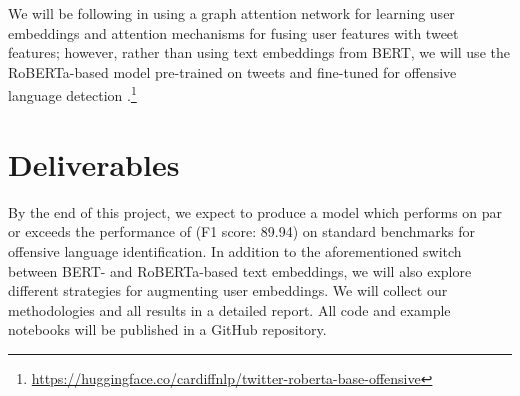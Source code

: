 \documentclass[letterpaper]{article} %
\begin{document}
We will be following \citet{Miao2022} in using a graph attention network for learning user embeddings and attention mechanisms for fusing user features with tweet features; however, rather than using text embeddings from BERT, we will use the RoBERTa-based model pre-trained on tweets and fine-tuned for offensive language detection \citep{Barbieri2020}.\footnote{\url{https://huggingface.co/cardiffnlp/twitter-roberta-base-offensive}}

\section{Deliverables}

By the end of this project, we expect to produce a model which performs on par or exceeds the performance of \citet{Miao2022} (F1 score: 89.94) on standard benchmarks for offensive language identification. In addition to the aforementioned switch between BERT- and RoBERTa-based text embeddings, we will also explore different strategies for augmenting user embeddings. We will collect our methodologies and all results in a detailed report. All code and example notebooks will be published in a GitHub repository. 

\appendix


\end{document}
